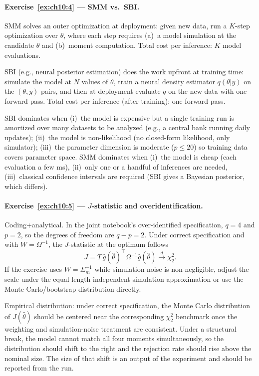 \documentclass[11pt,a4paper]{report}
\begin{document}
\paragraph{Exercise~\ref{ex:ch10:4} --- SMM vs.\ SBI.}
SMM solves an outer optimization at deployment: given new data, run a $K$-step optimization over $\theta$, where each step requires (a)~a model simulation at the candidate $\theta$ and (b)~moment computation.  Total cost per inference: $K$ model evaluations.

SBI (e.g., neural posterior estimation) does the work upfront at training time: simulate the model at $N$ values of $\theta$, train a neural density estimator $q(\theta | y)$ on the $(\theta, y)$ pairs, and then at deployment evaluate $q$ on the new data with one forward pass.  Total cost per inference (after training): one forward pass.

SBI dominates when (i)~the model is expensive but a single training run is amortized over many datasets to be analyzed (e.g., a central bank running daily updates); (ii)~the model is non-likelihood (no closed-form likelihood, only simulator); (iii)~the parameter dimension is moderate ($p \le 20$) so training data covers parameter space.  SMM dominates when (i)~the model is cheap (each evaluation a few ms), (ii)~only one or a handful of inferences are needed, (iii)~classical confidence intervals are required (SBI gives a Bayesian posterior, which differs).

\paragraph{Exercise~\ref{ex:ch10:5} --- $J$-statistic and overidentification.}
Coding+analytical.  In the joint notebook's over-identified specification, $q=4$ and $p=2$, so the degrees of freedom are $q-p=2$.  Under correct specification and with $W=\Omega^{-1}$, the $J$-statistic at the optimum follows
\[
   J
   =
   T\,\hat g(\hat\theta)^\top \Omega^{-1}\hat g(\hat\theta)
   \xrightarrow{d}
   \chi^2_{2}.
\]
If the exercise uses $W=\Sigma_m^{-1}$ while simulation noise is non-negligible, adjust the scale under the equal-length independent-simulation approximation or use the Monte Carlo/bootstrap distribution directly.

Empirical distribution: under correct specification, the Monte Carlo distribution of $J(\hat\theta)$ should be centered near the corresponding $\chi^2_2$ benchmark once the weighting and simulation-noise treatment are consistent.  Under a structural break, the model cannot match all four moments simultaneously, so the distribution should shift to the right and the rejection rate should rise above the nominal size.  The size of that shift is an output of the experiment and should be reported from the run.
\end{document}
